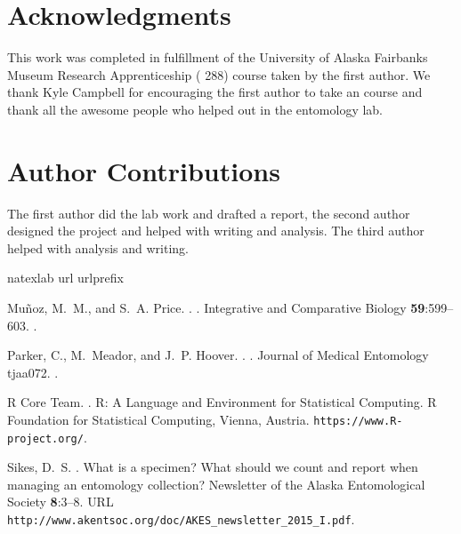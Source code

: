 \begin{multicols}{2} 

\section{Acknowledgments}

This work was completed in fulfillment of the University of Alaska Fairbanks Museum Research Apprenticeship ( 288) course taken by the first author. We thank Kyle Campbell for encouraging the first author to take an  course and thank all the awesome people who helped out in the  entomology lab. 

\section{Author Contributions}

The first author did the lab work and drafted a report, the second author designed the project and helped with writing and analysis. The third author helped with analysis and writing.

%

\begin{thebibliography}{7}
\expandafter\ifx\csname natexlab\endcsname\relax\def\natexlab#1{#1}\fi
\expandafter\ifx\csname url\endcsname\relax
  \def\url#1{{\tt #1}}\fi
\expandafter\ifx\csname urlprefix\endcsname\relax\def\urlprefix{{\small URL}
  }\fi

Mu\~{n}oz, M.~M., and S.~A. Price.
.
.
\newblock Integrative and Comparative Biology {\bfseries 59}:599--603.
\newblock {}.

Parker, C., M.~Meador, and J.~P. Hoover.
.
.
\newblock Journal of Medical Entomology  tjaa072.
\newblock {}.

{R Core Team}.
.
\newblock R: A Language and Environment for Statistical Computing.
\newblock R Foundation for Statistical Computing, Vienna, Austria.
\newblock \urlprefix\url{https://www.R-project.org/}.

Sikes, D.~S.
.
\newblock What is a specimen? What should we count and report when managing an
  entomology collection?
\newblock Newsletter of the Alaska Entomological Society {\bfseries 8}:3--8.
\newblock
  \urlprefix\url{http://www.akentsoc.org/doc/AKES_newsletter_2015_I.pdf}.


\end{thebibliography}
\end{multicols}
